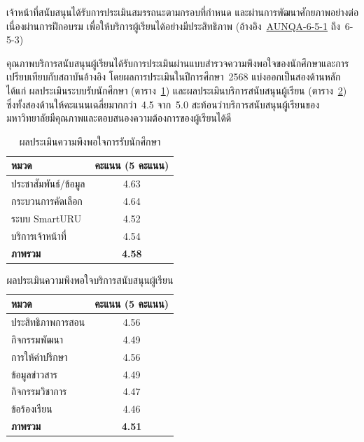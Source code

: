 เจ้าหน้าที่สนับสนุนได้รับการประเมินสมรรถนะตามกรอบที่กำหนด และผ่านการพัฒนาศักยภาพอย่างต่อเนื่องผ่านการฝึกอบรม เพื่อให้บริการผู้เรียนได้อย่างมีประสิทธิภาพ (อ้างอิง~\hyperlink{ref:AUNQA-6-5-1}{AUNQA-6-5-1} ถึง~6-5-3)


คุณภาพบริการสนับสนุนผู้เรียนได้รับการประเมินผ่านแบบสำรวจความพึงพอใจของนักศึกษาและการเปรียบเทียบกับสถาบันอ้างอิง โดยผลการประเมินในปีการศึกษา~2568 แบ่งออกเป็นสองด้านหลัก ได้แก่ ผลประเมินระบบรับนักศึกษา (ตาราง~\ref{tbl:admission_satisfaction}) และผลประเมินบริการสนับสนุนผู้เรียน (ตาราง~\ref{tbl:student_service_satisfaction}) ซึ่งทั้งสองด้านให้คะแนนเฉลี่ยมากกว่า~4.5 จาก~5.0 สะท้อนว่าบริการสนับสนุนผู้เรียนของมหาวิทยาลัยมีคุณภาพและตอบสนองความต้องการของผู้เรียนได้ดี
\begin{table}[H]
  \centering
  \caption{ผลประเมินความพึงพอใจการรับนักศึกษา}
  \label{tbl:admission_satisfaction}
  \begingroup
  \footnotesize
  \renewcommand{\arraystretch}{1.2}
  \begin{tabular}{|l|c|}
    \hline
    \textbf{หมวด} & \textbf{คะแนน (5 คะแนน)} \\
    \hline
    ประชาสัมพันธ์/ข้อมูล & 4.63 \\
    \hline
    กระบวนการคัดเลือก & 4.64 \\
    \hline
    ระบบ SmartURU & 4.52 \\
    \hline
    บริการเจ้าหน้าที่ & 4.54 \\
    \hline
    \textbf{ภาพรวม} & \textbf{4.58} \\
    \hline
  \end{tabular}
  \endgroup
\end{table}

\begin{table}[H]
  \centering
  \caption{ผลประเมินความพึงพอใจบริการสนับสนุนผู้เรียน}
  \label{tbl:student_service_satisfaction}
  \begingroup
  \footnotesize
  \renewcommand{\arraystretch}{1.2}
  \begin{tabular}{|l|c|}
    \hline
    \textbf{หมวด} & \textbf{คะแนน (5 คะแนน)} \\
    \hline
    ประสิทธิภาพการสอน & 4.56 \\
    \hline
    กิจกรรมพัฒนา & 4.49 \\
    \hline
    การให้คำปรึกษา & 4.56 \\
    \hline
    ข้อมูลข่าวสาร & 4.49 \\
    \hline
    กิจกรรมวิชาการ & 4.47 \\
    \hline
    ข้อร้องเรียน & 4.46 \\
    \hline
    \textbf{ภาพรวม} & \textbf{4.51} \\
    \hline
  \end{tabular}
  \endgroup
\end{table}

